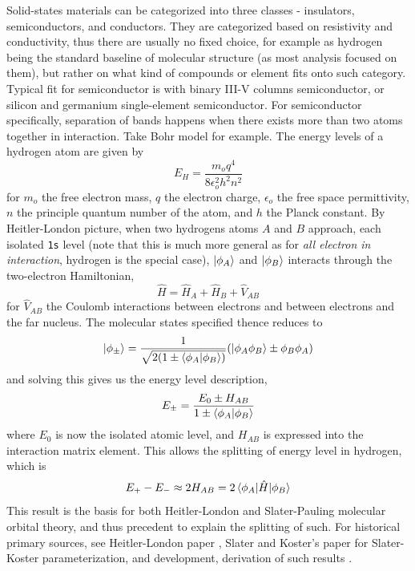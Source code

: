 \documentclass[%
 reprint,
 amsmath,amssymb,
 aps,
]{revtex4-2}
\begin{document}
Solid-states materials can be categorized into three classes - insulators, semiconductors, and conductors. They are categorized based on resistivity and conductivity, thus there are usually no fixed choice, for example as hydrogen being the standard baseline of molecular structure (as most analysis focused on them), but rather on what kind of compounds or element fits onto such category. Typical fit for semiconductor is with binary III-V columns semiconductor, or silicon and germanium single-element semiconductor. For semiconductor specifically, separation of bands happens when there exists more than two atoms together in interaction. Take Bohr model for example. The energy levels of a hydrogen atom are given by
\begin{equation}
    E_{H} = \frac{m_{o}q^{4}}{8\epsilon_{o}^{2}h^{2}n^2}
\end{equation}
for $m_{o}$ the free electron mass, $q$ the electron charge, $\epsilon_{o}$ the free space permittivity, $n$ the principle quantum number of the atom, and $h$ the Planck constant. By Heitler-London picture, when two hydrogens atoms $A$ and $B$ approach, each isolated \texttt{1s} level (note that this is much more general as for \textit{all electron in interaction}, hydrogen is the special case), $\ket{\phi_{A}}$ and $\ket{\phi_{B}}$ interacts through the two-electron Hamiltonian,
\begin{equation}
    \hat{H} = \hat{H}_{A} + \hat{H}_{B} + \hat{V}_{AB}
\end{equation}
for $\hat{V}_{AB}$ the Coulomb interactions between electrons and between electrons and the far nucleus. The molecular states specified thence reduces to
\begin{equation}
    \ket{\phi_{\pm}} = \frac{1}{\sqrt{2(1\pm \braket{\phi_{A}|\phi_{B}})}}(\ket{\phi_{A}\phi_{B}}\pm\phi_{B}\phi_{A})
\end{equation}
and solving this gives us the energy level description,
\begin{equation}
    E_{\pm} = \frac{E_{0}\pm H_{AB}}{1\pm \braket{\phi_{A}|\phi_{B}}}
\end{equation}
where $E_{0}$ is now the isolated atomic level, and $H_{AB}$ is expressed into the interaction matrix element. This allows the splitting of energy level in hydrogen, which is
\begin{equation}
    E_{+} - E_{-} \approx 2H_{AB} = 2 \braket{\phi_{A}|\hat{H}|\phi_{B}}
\end{equation}
This result is the basis for both Heitler-London and Slater-Pauling molecular orbital theory, and thus precedent to explain the splitting of such. For historical primary sources, see Heitler-London paper \cite{HeitlerLondon1927}, Slater and Koster's paper \cite{SlaterKoster1954} for Slater-Koster parameterization, and development, derivation of such results \cite{Papaconstantopoulos2003,Harrison1980,AshcroftMermin1976,kittel2005,SzaboOstlund1989,KolosWolniewicz1965}. 
\end{document}
